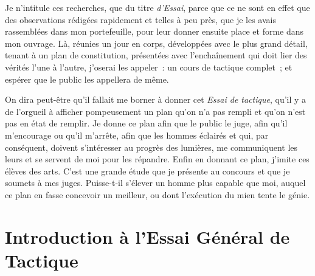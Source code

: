 \documentclass[french,twoside]{book} %
\begin{document}
Je n’intitule ces recherches, que du titre {\itshape d’Essai}, parce que ce ne sont en effet que des observations rédigées rapidement et telles à peu près, que je les avais rassemblées dans mon portefeuille, pour leur donner ensuite place et forme dans mon ouvrage. Là, réunies un jour en corps, développées avec le plus grand détail, tenant à un plan de constitution, présentées avec l’enchaînement qui doit lier des vérités l’une à l’autre, j’oserai les appeler : un cours de tactique complet ; et espérer que le public les appellera de même.\par
On dira peut-être qu’il fallait me borner à donner cet {\itshape Essai de tactique}, qu’il y a de l’orgueil à afficher pompeusement un plan qu’on n’a pas rempli et qu’on n’est pas en état de remplir. Je donne ce plan afin que le public le juge, afin qu’il m’encourage ou qu’il m’arrête, afin que les hommes éclairés et qui, par conséquent, doivent s’intéresser au progrès des lumières, me communiquent les leurs et se servent de moi pour les répandre. Enfin en donnant ce plan, j’imite ces élèves des arts. C’est une grande étude que je présente au concours et que je soumets à mes juges. Puisse-t-il s’élever un homme plus capable que moi, auquel ce plan en fasse concevoir un meilleur, ou dont l’exécution du mien tente le génie.
\section[{Introduction à l’Essai Général de Tactique}]{Introduction à l’Essai Général de Tactique}\renewcommand{\leftmark}{Introduction à l’Essai Général de Tactique}
\end{document}
